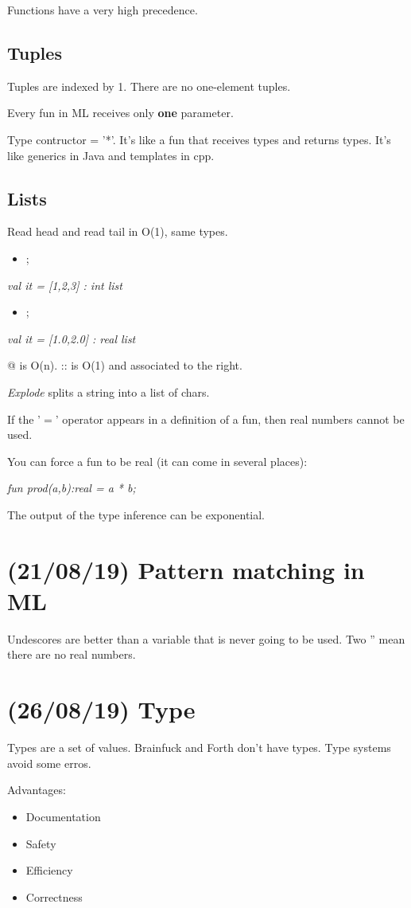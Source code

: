 \documentclass[11pt]{article}
\begin{document}
Functions have a very high precedence.

\subsection{Tuples}
\label{sec:orge8e86ad}
Tuples are indexed by 1. There are no one-element tuples.

Every fun in ML receives only \textbf{one} parameter.

Type contructor = '*'. It's like a fun that receives types and returns types. It's like
generics in Java and templates in cpp.

\subsection{Lists}
\label{sec:org6cbd8c5}
Read head and read tail in O(1), same types.
\begin{itemize}
\item\relax [1,2,3];
\end{itemize}
\emph{val it = [1,2,3] : int list}
\begin{itemize}
\item\relax [1.0,2.0];
\end{itemize}
\emph{val it = [1.0,2.0] : real list}

@ is O(n). :: is O(1) and associated to the right.

\emph{Explode} splits a string into a list of chars.

If the '\(=\)' operator appears in a definition of a fun, then real numbers cannot be used.

You can force a fun to be real (it can come in several places):

\emph{fun prod(a,b):real = a * b;}

The output of the type inference can be exponential.
\section{(21/08/19) Pattern matching in ML}
\label{sec:orgab99feb}
Undescores are better than a variable that is never going to be used.
Two '' mean there are no real numbers.
\section{(26/08/19) Type}
\label{sec:org1ce2662}
Types are a set of values. Brainfuck and Forth don't have types. Type systems avoid some
erros.

Advantages:
\begin{itemize}
\item Documentation
\item Safety
\item Efficiency
\item Correctness
\end{itemize}
\end{document}
